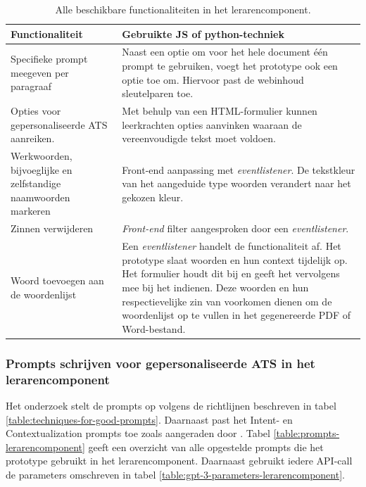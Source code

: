 \begin{center}
	\begin{table}[H]
		\begin{tabular}{ | m{7cm} | m{8cm} | } 
			\hline
			\textbf{Functionaliteit} & Gebruikte JS of python-techniek \\
			\hline
			Specifieke prompt meegeven per paragraaf & Naast een optie om voor het hele document één prompt te gebruiken, voegt het prototype ook een optie toe om. Hiervoor past de webinhoud sleutelparen toe. \\
			\hline
			Opties voor gepersonaliseerde ATS aanreiken. & Met behulp van een HTML-formulier kunnen leerkrachten opties aanvinken waaraan de vereenvoudigde tekst moet voldoen. \\
			\hline
			Werkwoorden, bijvoeglijke en zelfstandige naamwoorden markeren & Front-end aanpassing met \textit{eventlistener}. De tekstkleur van het aangeduide type woorden verandert naar het gekozen kleur. \\
			\hline
			Zinnen verwijderen & \textit{Front-end} filter aangesproken door een \textit{eventlistener}. \\
			\hline
			Woord toevoegen aan de woordenlijst & Een \textit{eventlistener} handelt de functionaliteit af. Het prototype slaat woorden en hun context tijdelijk op. Het formulier houdt dit bij en geeft het vervolgens mee bij het indienen. Deze woorden en hun respectievelijke zin van voorkomen dienen om de woordenlijst op te vullen in het gegenereerde PDF of Word-bestand. \\ 
			\hline 
		\end{tabular}
	\caption{Alle beschikbare functionaliteiten in het lerarencomponent.}
	\label{table:functionaliteiten-leerkrachten}
	\end{table}
\end{center}

\subsubsection{Prompts schrijven voor gepersonaliseerde ATS in het lerarencomponent}

Het onderzoek stelt de prompts op volgens de richtlijnen beschreven in tabel \ref{table:techniques-for-good-prompts}. Daarnaast past het Intent- en Contextualization prompts toe zoals aangeraden door \textcite{White2023}. Tabel \ref{table:prompts-lerarencomponent} geeft een overzicht van alle opgestelde prompts die het prototype gebruikt in het lerarencomponent. Daarnaast gebruikt iedere API-call de parameters omschreven in tabel \ref{table:gpt-3-parameters-lerarencomponent}.


